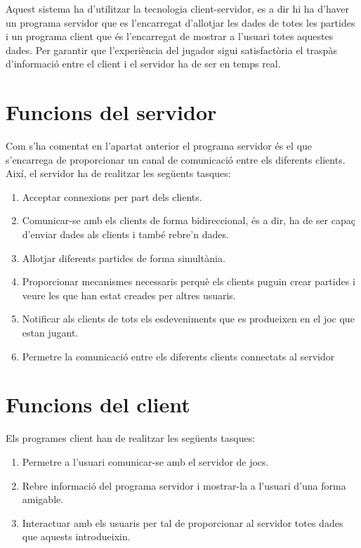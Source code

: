 Aquest sistema ha d'utilitzar la tecnologia client-servidor, es a dir hi ha d'haver un programa servidor que es l'encarregat d'allotjar les dades de totes les partides i un programa client que és l'encarregat de mostrar a l'usuari totes aquestes dades. Per garantir que l'experiència del jugador sigui satisfactòria el traspàs d'informació entre el client i el servidor ha de ser en temps real. 

\section{Funcions del servidor}

Com s'ha comentat en l'apartat anterior el programa servidor és el que s'encarrega de proporcionar un canal de comunicació entre els diferents clients. Així, el servidor ha de realitzar les següents tasques:

\begin{enumerate}
	\item{Acceptar connexions per part dels clients.}
	\item{Comunicar-se amb els clients de forma bidireccional, és a dir, ha de ser capaç d'enviar dades als clients  i també rebre'n dades.}
	\item{Allotjar diferents partides de forma simultània.}
	\item{Proporcionar mecanismes necessaris perquè els clients puguin crear partides i veure les que han estat creades per altres usuaris.}
	\item{Notificar als clients de tots els esdeveniments que es produeixen en el joc que estan jugant.}
	\item{Permetre la comunicació entre els diferents clients connectats al servidor}	
\end{enumerate}

\section{Funcions del client}

Els programes client han de realitzar les següents tasques: 

\begin{enumerate}
	\item{Permetre a l'usuari comunicar-se amb el servidor de jocs.}
	\item{Rebre informació del programa servidor i mostrar-la a l'usuari d'una forma amigable.}
	\item{Interactuar amb els usuaris per tal de proporcionar al servidor totes dades que aquests introdueixin.}	
\end{enumerate}



